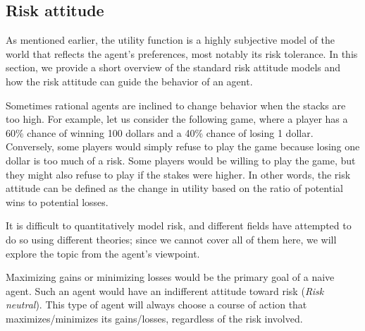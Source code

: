 \subsection{Risk attitude}
As mentioned earlier, the utility function is a highly subjective model of the world that reflects the agent's preferences, most notably its risk tolerance. In this section, we provide a short overview of the standard risk attitude models and how the risk attitude can guide the behavior of an agent.

Sometimes rational agents are inclined to change behavior when the stacks are too high. For example, let us consider the following game, where a player has a 60\% chance of winning 100 dollars and a 40\% chance of losing 1 dollar. Conversely, some players would simply refuse to play the game because losing one dollar is too much of a risk. Some players would be willing to play the game, but they might also refuse to play if the stakes were higher. In other words, the risk attitude can be defined as the change in utility based on the ratio of potential wins to potential losses.

It is difficult to quantitatively model risk, and different fields have attempted to do so using different theories; since we cannot cover all of them here, we will explore the topic from the agent's viewpoint.

Maximizing gains or minimizing losses would be the primary goal of a naive agent. Such an agent would have an indifferent attitude toward risk (\textit{Risk neutral}). This type of agent will always choose a course of action that maximizes/minimizes its gains/losses, regardless of the risk involved.

